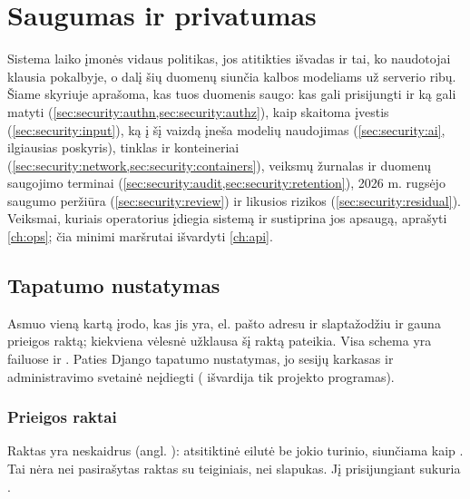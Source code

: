\chapter{Saugumas ir privatumas}\label{ch:security}

Sistema laiko įmonės vidaus politikas, jos atitikties išvadas ir tai, ko naudotojai klausia
pokalbyje, o dalį šių duomenų siunčia kalbos modeliams už serverio ribų. Šiame skyriuje
aprašoma, kas tuos duomenis saugo: kas gali prisijungti ir ką gali matyti
(\cref{sec:security:authn,sec:security:authz}), kaip skaitoma įvestis (\cref{sec:security:input}),
ką į šį vaizdą įneša modelių naudojimas (\cref{sec:security:ai}, ilgiausias poskyris), tinklas
ir konteineriai (\cref{sec:security:network,sec:security:containers}), veiksmų žurnalas ir
duomenų saugojimo terminai (\cref{sec:security:audit,sec:security:retention}), 2026 m. rugsėjo
saugumo peržiūra (\cref{sec:security:review}) ir likusios rizikos
(\cref{sec:security:residual}). Veiksmai, kuriais operatorius įdiegia sistemą ir sustiprina jos apsaugą,
aprašyti \cref{ch:ops}; čia minimi maršrutai išvardyti \cref{ch:api}.


\section{Tapatumo nustatymas}\label{sec:security:authn}

Asmuo vieną kartą įrodo, kas jis yra, el. pašto adresu ir slaptažodžiu ir gauna prieigos
raktą; kiekviena vėlesnė užklausa šį raktą pateikia. Visa schema yra failuose 
ir . Paties Django tapatumo nustatymas, jo sesijų karkasas ir
administravimo svetainė neįdiegti ( išvardija tik projekto programas).

\subsection{Prieigos raktai}

Raktas yra neskaidrus  (angl. ): atsitiktinė eilutė be
jokio turinio, siunčiama kaip   . Tai nėra nei
pasirašytas raktas su teiginiais, nei slapukas. Jį prisijungiant sukuria .

